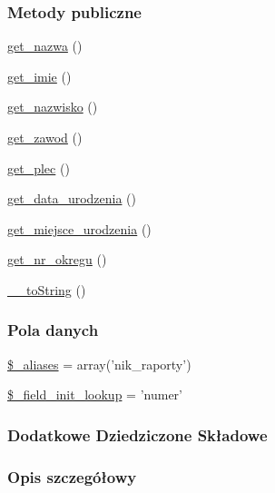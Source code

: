 \subsubsection*{Metody publiczne}
\begin{DoxyCompactItemize}
\item 
\hyperlink{classep___n_i_k__raport_ac0818f0049d7b84f08f77128f54cee36}{get\-\_\-nazwa} ()
\item 
\hyperlink{classep___n_i_k__raport_ac4b0c85dc2a130038f2d118dbd0c3d77}{get\-\_\-imie} ()
\item 
\hyperlink{classep___n_i_k__raport_abdd1d7ff92508da7f748ba1feec97af0}{get\-\_\-nazwisko} ()
\item 
\hyperlink{classep___n_i_k__raport_af80ca8310b60004454dd02a387deaa2c}{get\-\_\-zawod} ()
\item 
\hyperlink{classep___n_i_k__raport_ac7f9af5c3fa024e4c26a7b6bd4ce4bb4}{get\-\_\-plec} ()
\item 
\hyperlink{classep___n_i_k__raport_a880b240cd2d8c336fd1709bf0cb1ae2c}{get\-\_\-data\-\_\-urodzenia} ()
\item 
\hyperlink{classep___n_i_k__raport_ac57c08ec5e394a19c5bd9280c8376182}{get\-\_\-miejsce\-\_\-urodzenia} ()
\item 
\hyperlink{classep___n_i_k__raport_a2645a9f0aa5b0ccc482943348c033d0a}{get\-\_\-nr\-\_\-okregu} ()
\item 
\hyperlink{classep___n_i_k__raport_a7516ca30af0db3cdbf9a7739b48ce91d}{\-\_\-\-\_\-to\-String} ()
\end{DoxyCompactItemize}
\subsubsection*{Pola danych}
\begin{DoxyCompactItemize}
\item 
\hyperlink{classep___n_i_k__raport_ab4e31d75f0bc5d512456911e5d01366b}{\$\-\_\-aliases} = array('nik\-\_\-raporty')
\item 
\hyperlink{classep___n_i_k__raport_a4a4d54ae35428077a7c61ec8a5139af3}{\$\-\_\-field\-\_\-init\-\_\-lookup} = 'numer'
\end{DoxyCompactItemize}
\subsubsection*{Dodatkowe Dziedziczone Składowe}


\subsubsection{Opis szczegółowy}


